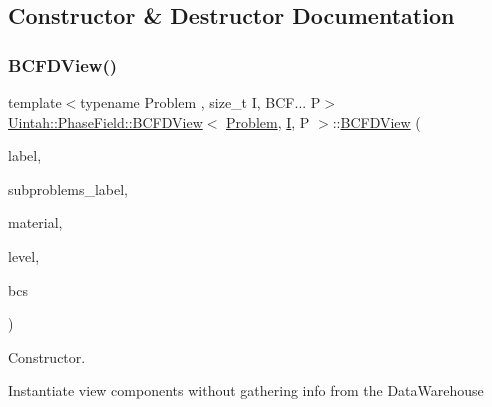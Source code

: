 \subsection{Constructor \& Destructor Documentation}
\mbox{\label{classUintah_1_1PhaseField_1_1BCFDView_ad4373326efd0b7c9cbe0c6dc3ad47c20}} 
\subsubsection{\texorpdfstring{B\+C\+F\+D\+View()}{BCFDView()}\hspace{0.1cm}{\footnotesize\ttfamily [1/3]}}
{\footnotesize\ttfamily template$<$typename Problem , size\+\_\+t I, B\+C\+F... P$>$ \\
\hyperlink{classUintah_1_1PhaseField_1_1BCFDView}{Uintah\+::\+Phase\+Field\+::\+B\+C\+F\+D\+View}$<$ \hyperlink{classUintah_1_1PhaseField_1_1Problem}{Problem}, \hyperlink{structUintah_1_1PhaseField_1_1I}{I}, P $>$\+::\hyperlink{classUintah_1_1PhaseField_1_1BCFDView}{B\+C\+F\+D\+View} (\begin{DoxyParamCaption}\item[{const typename Field\+::label\+\_\+type \&}]{label,  }\item[{const Var\+Label $\ast$}]{subproblems\+\_\+label,  }\item[{int}]{material,  }\item[{const Level $\ast$}]{level,  }\item[{const std\+::vector$<$ \hyperlink{structUintah_1_1PhaseField_1_1BCInfo}{B\+C\+Info}$<$ Field $>$ $>$ \&}]{bcs }\end{DoxyParamCaption})\hspace{0.3cm}{\ttfamily [inline]}}



Constructor. 

Instantiate view components without gathering info from the Data\+Warehouse



